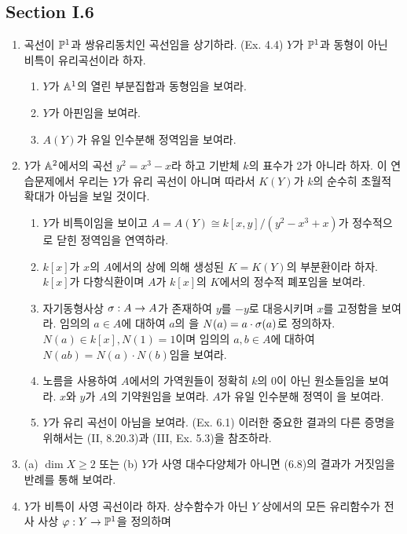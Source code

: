 	
	
	\subsection*{Section I.6}
	
	\begin{enumerate}[label=\tb{6.\arabic*.},itemindent=0mm,itemsep=4mm]
		\item {} 곡선이 $\mathbb{P}^1$과 쌍유리동치인 곡선임을 상기하라. (Ex. 4.4)
		$Y$가 $\mathbb{P}^1$과 동형이 아닌 비특이 유리곡선이라 하자.
		\begin{enumerate}[label=(\alph*)]
			\item $Y$가 $\mathbb{A}^1$의 열린 부분집합과 동형임을 보여라.
			\item $Y$가 아핀임을 보여라.
			\item $A(Y)$가 유일 인수분해 정역임을 보여라.
		\end{enumerate}
		\item {} $Y$가 $\mathbb{A}^2$에서의 곡선 $y^2=x^3-x$라 하고 기반체 $k$의 표수가 2가 아니라 하자.
		이 연습문제에서 우리는 $Y$가 유리 곡선이 아니며 따라서 $K(Y)$가 $k$의 순수히 초월적 확대가 아님을 보일 것이다.
		\begin{enumerate}[label=(\alph*)]
			\item $Y$가 비특이임을 보이고 $A=A(Y)\cong k[x,y]/(y^2-x^3+x)$가 정수적으로 닫힌 정역임을 연역하라.
			\item $k[x]$가 $x$의 $A$에서의 상에 의해 생성된 $K=K(Y)$의 부분환이라 하자.
			$k[x]$가 다항식환이며 $A$가 $k[x]$의 $K$에서의 정수적 폐포임을 보여라.
			\item 자기동형사상 $\sigma:A\rightarrow A$가 존재하여 $y$를 $-y$로 대응시키며 $x$를 고정함을 보여라.
			임의의 $a\in A$에 대하여 $a$의 을 $N(a)=a\cdot\sigma(a)$로 정의하자.
			$N(a)\in k[x],N(1)=1$이며 임의의 $a,b\in A$에 대하여 $N(ab)=N(a)\cdot N(b)$임을 보여라.
			\item 노름을 사용하여 $A$에서의 가역원들이 정확히 $k$의 0이 아닌 원소들임을 보여라.
			$x$와 $y$가 $A$의 기약원임을 보여라. $A$가 유일 인수분해 정역이 을 보여라.
			\item $Y$가 유리 곡선이 아님을 보여라. (Ex. 6.1)
			이러한 중요한 결과의 다른 증명을 위해서는 (II, 8.20.3)과 (III, Ex. 5.3)을 참조하라.
		\end{enumerate}
		\item (a) $\dim X\ge 2$ 또는 (b) $Y$가 사영 대수다양체가 아니면 (6.8)의 결과가 거짓임을 반례를 통해 보여라.
		\item $Y$가 비특이 사영 곡선이라 하자. 상수함수가 아닌 $Y$ 상에서의 모든 유리함수가 전사 사상 $\varphi:Y\rightarrow\mathbb{P}^1$을 정의하며

\end{enumerate}
